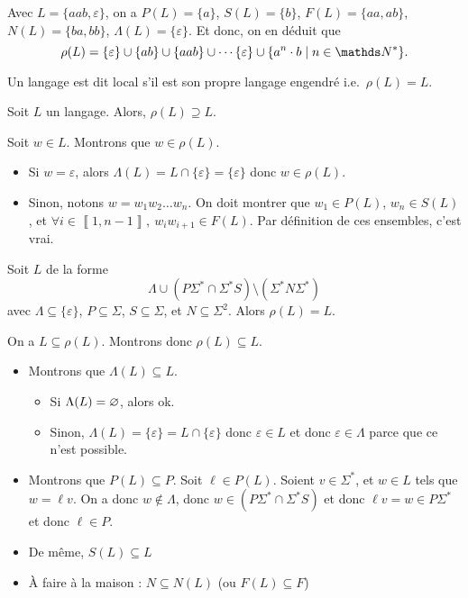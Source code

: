\begin{exm}
	Avec $L = \{aab, \varepsilon\}$, on a $P(L) = \{a\}$, $S(L) = \{b\}$, $F(L) = \{aa,ab\}$, $N(L) = \{ba,bb\}$, $\Lambda(L) = \{\varepsilon\}$. Et donc, on en déduit que \[
		\rho(L) = \{\varepsilon\} \cup \{ab\} \cup \{aab\} \cup \cdots \{\varepsilon\} \cup \{a^n\cdot b  \mid n \in \N^*\}
	.\] 
\end{exm}

\begin{defn}
	Un langage est dit local s'il est son propre langage engendré i.e.\ $\rho(L) = L$.
\end{defn}

\begin{prop}
	Soit $L$\/ un langage. Alors, $\rho(L) \supseteq L$.
\end{prop}

\begin{prv}
	Soit $w \in L$. Montrons que $w \in \rho(L)$.
	\begin{itemize}
		\item Si $w = \varepsilon$, alors $\Lambda(L) = L \cap \{\varepsilon\} = \{\varepsilon\}$\/ donc $w \in \rho(L)$.
		\item Sinon, notons $w = w_1w_2\ldots w_n$. On doit montrer que $w_1 \in P(L)$, $w_n \in S(L)$, et $\forall i \in \left\llbracket 1,n-1 \right\rrbracket,\:w_i w_{i+1} \in F(L)$. Par définition de ces ensembles, c'est vrai.
	\end{itemize}
\end{prv}

\begin{prop}
	Soit $L$\/ de la forme \[
		\Lambda \cup (P\Sigma^* \cap \Sigma^* S) \setminus (\Sigma^* N\Sigma^*)
	\] avec $\Lambda \subseteq \{\varepsilon\}$, $P \subseteq \Sigma$, $S \subseteq \Sigma$, et $N \subseteq \Sigma^2$.
	Alors $\rho(L) = L$.
\end{prop}

\begin{prv}
	On a $L \subseteq \rho(L)$. Montrons donc $\rho(L)\subseteq L$.

	\begin{itemize}
		\item Montrons que $\Lambda(L) \subseteq L$.
			\begin{itemize}
				\item Si $\Lambda(L) = \varnothing$, alors {\sc ok}.
				\item Sinon, $\Lambda (L) = \{\varepsilon\} = L \cap \{\varepsilon\}$\/ donc $\varepsilon \in L$\/ et donc $\varepsilon \in \Lambda$\/ parce que ce n'est possible.
			\end{itemize}
		\item Montrons que $P(L) \subseteq P$. Soit $\ell \in P(L)$. Soient $v \in \Sigma^*$, et $w \in L$\/ tels que $w = \ell v$. On a donc $w \not\in  \Lambda$, donc $w \in (P\Sigma^* \cap \Sigma^* S)$\/ et donc $\ell v = w \in P\Sigma^*$\/ et donc $\ell \in P$.
		\item De même, $S(L) \subseteq L$\/
		\item À faire à la maison : $N \subseteq N(L)$\/ (ou $F(L) \subseteq F$)
	\end{itemize}
\end{prv}


